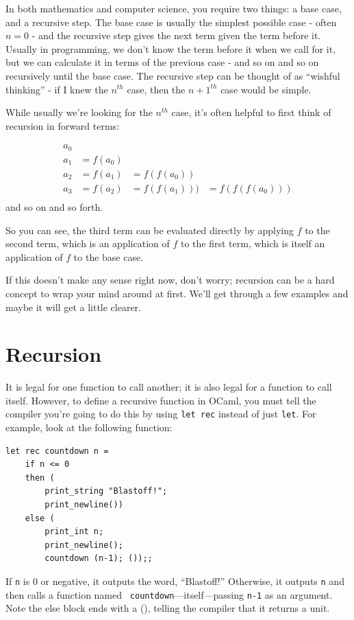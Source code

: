\documentclass[10pt]{book}
\begin{document}
In both mathematics and computer science, you require two 
things: a base case, and a recursive step. The base case is 
usually the simplest possible case - often $n = 0$ - and the
recursive step gives the next term given the term before it.
Usually in programming, we don't know the term before it when 
we call for it, but we can calculate it in terms of the previous 
case - and so on and so on recursively until the base case. The 
recursive step can be thought of as ``wishful thinking'' - if I 
knew the $n^{th}$ case, then the ${n+1}^{th}$ case would be simple.

While usually we're looking for the $n^{th}$ case, it's often
helpful to first think of recursion in forward terms:

\begin{align*}
a_0 &&& \\
a_1 &= f(a_0) && \\
a_2 &= f(a_1) & = f(f(a_0)) &\\
a_3 &= f(a_2) & = f(f(a_1))) &= f(f(f(a_0))) \\
\end{align*}
and so on and so forth.

So you can see, the third term can be 
evaluated directly by applying $f$ to the second term, which is 
an application of $f$ to the first term, which is itself an 
application of $f$ to the base case.

If this doesn't make any sense right now, don't worry; recursion 
can be a hard concept to wrap your mind around at first. We'll get
through a few examples and maybe it will get a little clearer.

\section{Recursion}

It is legal for one function to call another; it is also legal 
for a function to call itself. However, to define a recursive
function in OCaml, you must tell the compiler you're going to
do this by using {\tt let rec} instead of just {\tt let}.
For example, look at the following function:

\beforeverb
\begin{verbatim}
let rec countdown n = 
	if n <= 0
	then (
		print_string "Blastoff!";
		print_newline())
	else (
		print_int n;
		print_newline();
		countdown (n-1); ());;
\end{verbatim}
\afterverb
%
If {\tt n} is 0 or negative, it outputs the word, ``Blastoff!''
Otherwise, it outputs {\tt n} and then calls a function named {\tt
countdown}---itself---passing {\tt n-1} as an argument. Note the else
block ends with a (), telling the compiler that it returns a unit.
\end{document}
